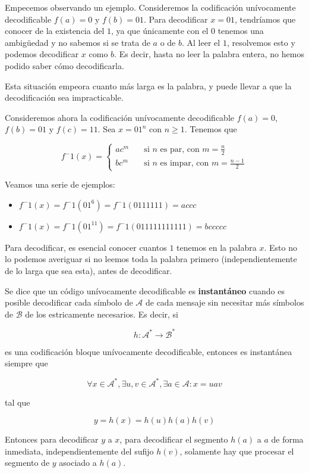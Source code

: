Empecemos observando un ejemplo. Consideremos la codificación
unívocamente decodificable \(f(a)=0\) y \(f(b)=01\). Para decodificar
\(x=01\), tendríamos que conocer de la existencia del \(1\), ya que
únicamente con el \(0\) tenemos una ambigüedad y no sabemos si se trata
de \(a\) o de \(b\). Al leer el \(1\), resolvemos esto y podemos
decodificar \(x\) como \(b\). Es decir, hasta no leer la palabra entera,
no hemos podido saber cómo decodificarla.

Esta situación empeora cuanto más larga es la palabra, y puede llevar a
que la decodificación sea impracticable.

Consideremos ahora la codificación unívocamente decodificable
\(f(a)=0\), \(f(b)=01\) y \(f(c)=11\). Sea \(x=01^n\) con \(n\geq 1\).
Tenemos que

\[
f^-1(x) = \begin{cases}
ac^m&\quad\text{si }n\text{ es par, con }m=\frac{n}{2}\\
bc^m&\quad\text{si }n\text{ es impar, con }m=\frac{n-1}{2}
\end{cases}
\]

Veamos una serie de ejemplos:

\begin{itemize}
\tightlist
\item
  \(f^-1(x)=f^-1(01^6)=f^-1(0111111)=accc\)
\item
  \(f^-1(x)=f^-1(01^{11})=f^-1(011111111111)=bccccc\)
\end{itemize}

Para decodificar, es esencial conocer cuantos \(1\) tenemos en la
palabra \(x\). Esto no lo podemos averiguar si no leemos toda la palabra
primero (independientemente de lo larga que sea esta), antes de
decodificar.

Se dice que un código unívocamente decodificable es \textbf{instantáneo}
cuando es posible decodificar cada símbolo de \(\mathcal{A}\) de cada
mensaje sin necesitar más símbolos de \(\mathcal{B}\) de los
estricamente necesarios. Es decir, si

\[
h:\mathcal{A}^*\rightarrow\mathcal{B}^*
\]

es una codificación bloque unívocamente decodificable, entonces es
instantánea siempre que

\[
\forall x\in\mathcal{A}^*, \exists u,v\in\mathcal{A}^*,\exists a\in\mathcal{A}: x=uav
\]

tal que

\[
y=h(x)=h(u)h(a)h(v)
\]

Entonces para decodificar \(y\) a \(x\), para decodificar el segmento
\(h(a)\) a \(a\) de forma inmediata, independientemente del sufijo
\(h(v)\), solamente hay que procesar el segmento de \(y\) asociado a
\(h(a)\).

